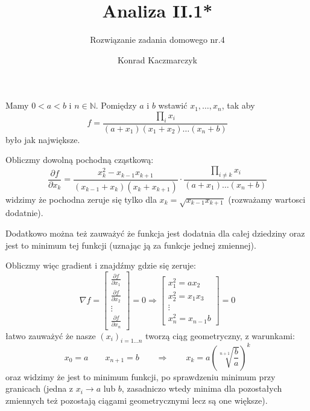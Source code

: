 \documentclass[11pt]{scrartcl}
\author{Konrad Kaczmarczyk}
\begin{document}
  \title{Analiza II.1*}
  \subtitle{Rozwiązanie zadania domowego nr.4}
  \maketitle
    \begin{zadanie*}
        Mamy $0 < a < b$ i $n \in \mathbb{N} $. Pomiędzy $a$ i $b$ wstawić $x_{1}, \dots , x_n$, tak aby
        \[
            f = \frac{\prod_{i} x_i  }{(a+x_1)(x_1 + x_2)\dots (x_n + b)}
        \]
        było jak największe.
    \end{zadanie*}

    Obliczmy dowolną pochodną cząstkową:
    \[
      \frac{\partial f}{\partial x_k} =
      \frac{x_k^2 - x_{k-1} x_{k+1}}{(x_{k-1} + x_{k})(x_k + x_{k+1})} \cdot 
      \frac{\prod_{i \not = k} x_i  }{(a + x_1)\dots (x_n + b)}  
    \]
    widzimy że pochodna zeruje się tylko dla $x_k = \sqrt{x_{k-1} x_{k+1}} $ (rozważamy wartosci dodatnie). 

    Dodatkowo można też zauważyć że funkcja jest dodatnia dla całej dziedziny oraz jest to minimum tej funkcji (uznając ją za funkcje jednej zmiennej).

    Obliczmy więc gradient i znajdźmy gdzie się zeruje:
    \[
        \nabla f =
        \begin{bmatrix}
          \frac{\partial f}{\partial x_1} \\
          \frac{\partial f}{\partial x_2} \\
          \vdots \\
          \frac{\partial f}{\partial x_n}
        \end{bmatrix}
        = 0
        \Rightarrow 
        \begin{bmatrix}
          x_1^2 = a x_2 \\
          x_2^2 = x_1 x_3 \\
          \vdots \\
          x_n^2 = x_{n-1} b
        \end{bmatrix}
        = 0
    \]
    łatwo zauważyć że nasze $(x_i)_{i = 1 \dots n}$ tworzą ciąg geometryczny, z warunkami:
    \[
      x_0 = a \qquad x_{n+1} = b \qquad \Rightarrow \qquad x_k = a \left ( \sqrt[n+1]{\frac{b}{a}}  \right )^k
    \]
    oraz widzimy że jest to minimum funkcji, po sprawdzeniu minimum przy granicach (jedna z $x_i \to a$ lub $b$, zasadniczo wtedy minima dla pozostałych zmiennych też pozostają ciągami geometrycznymi lecz są one większe).
\end{document}
